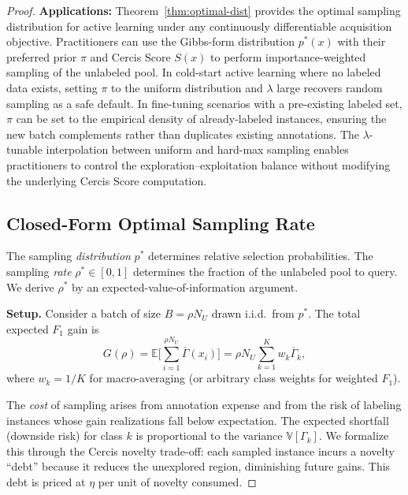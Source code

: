 \documentclass[12pt,a4paper]{article}
\newcommand{\E}{\mathbb{E}}
\newcommand{\V}{\mathbb{V}}
\begin{document}
\begin{proof}
\medskip\noindent
\textbf{Applications:}
Theorem~\ref{thm:optimal-dist} provides the optimal sampling distribution for
active learning under any continuously differentiable acquisition objective.
Practitioners can use the Gibbs-form distribution $p^*(x)$ with their preferred
prior $\pi$ and Cercis Score $S(x)$ to perform importance-weighted sampling of
the unlabeled pool.  In cold-start active learning where no labeled data exists,
setting $\pi$ to the uniform distribution and $\lambda$ large recovers random
sampling as a safe default.  In fine-tuning scenarios with a pre-existing labeled
set, $\pi$ can be set to the empirical density of already-labeled instances,
ensuring the new batch complements rather than duplicates existing annotations.
The $\lambda$-tunable interpolation between uniform and hard-max sampling enables
practitioners to control the exploration--exploitation balance without modifying
the underlying Cercis Score computation.

\subsection{Closed-Form Optimal Sampling Rate}

The sampling \emph{distribution} $p^*$ determines relative selection
probabilities.  The sampling \emph{rate} $\rho^*\in[0,1]$ determines the
fraction of the unlabeled pool to query.  We derive $\rho^*$ by an
expected-value-of-information argument.

\medskip\noindent
\textbf{Setup.}
Consider a batch of size $B=\rho N_U$ drawn i.i.d.\ from $p^*$.
The total expected $F_1$ gain is
\begin{equation}\label{eq:total-gain}
    G(\rho) = \E\Big[\sum_{i=1}^{\rho N_U} \overline{\Gamma}(x_i)\Big]
    = \rho N_U\sum_{k=1}^K w_k\overline{\Gamma}_k,
\end{equation}
where $w_k=1/K$ for macro-averaging (or arbitrary class weights for
weighted $F_1$).

The \emph{cost} of sampling arises from annotation expense and from the
risk of labeling instances whose gain realizations fall below expectation.
The expected shortfall (downside risk) for class $k$ is proportional to
the variance $\V[\Gamma_k]$.  We formalize this through the Cercis novelty
trade-off: each sampled instance incurs a novelty ``debt'' because it
reduces the unexplored region, diminishing future gains.  This
debt is priced at $\eta$ per unit of novelty consumed.


\end{proof}
\end{document}
